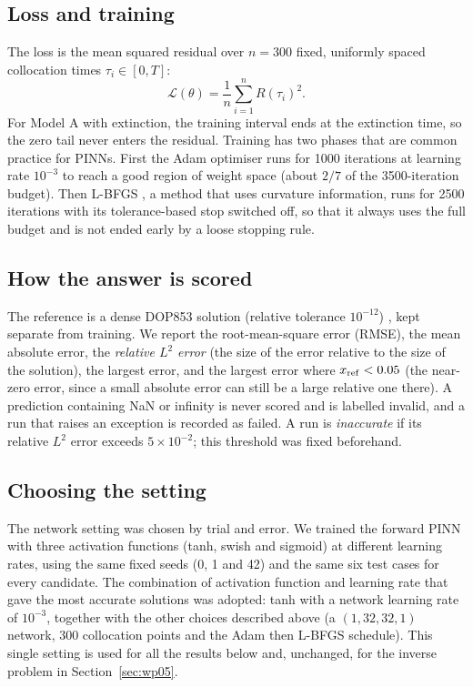 \subsection{Loss and training}
The loss is the mean squared residual over $n=300$ fixed, uniformly spaced collocation times $\tau_i\in[0,T]$:
\begin{equation}
\mathcal L(\theta)=\frac1n\sum_{i=1}^{n}R(\tau_i)^2 .
\end{equation}
For Model A with extinction, the training interval ends at the extinction time, so the zero tail never enters the residual. Training has two phases that are common practice for PINNs. First the Adam optimiser \cite{kingma2015adam} runs for 1000 iterations at learning rate $10^{-3}$ to reach a good region of weight space (about $2/7$ of the 3500-iteration budget). Then L-BFGS \cite{liu1989limited}, a method that uses curvature information, runs for 2500 iterations with its tolerance-based stop switched off, so that it always uses the full budget and is not ended early by a loose stopping rule.

\subsection{How the answer is scored}
The reference is a dense DOP853 solution (relative tolerance $10^{-12}$) \cite{hairer1993solving}, kept separate from training. We report the root-mean-square error (RMSE), the mean absolute error, the \emph{relative $L^2$ error} (the size of the error relative to the size of the solution), the largest error, and the largest error where $x_{\rm ref}<0.05$ (the near-zero error, since a small absolute error can still be a large relative one there). A prediction containing NaN or infinity is never scored and is labelled invalid, and a run that raises an exception is recorded as failed. A run is \emph{inaccurate} if its relative $L^2$ error exceeds $5\times10^{-2}$; this threshold was fixed beforehand.

\subsection{Choosing the setting}
\label{sec:selection}
The network setting was chosen by trial and error. We trained the forward PINN with three activation functions (tanh, swish \cite{ramachandran2017searching} and sigmoid) at different learning rates, using the same fixed seeds (0, 1 and 42) and the same six test cases for every candidate. The combination of activation function and learning rate that gave the most accurate solutions was adopted: tanh with a network learning rate of $10^{-3}$, together with the other choices described above (a $(1,32,32,1)$ network, 300 collocation points and the Adam then L-BFGS schedule). This single setting is used for all the results below and, unchanged, for the inverse problem in Section~\ref{sec:wp05}.


